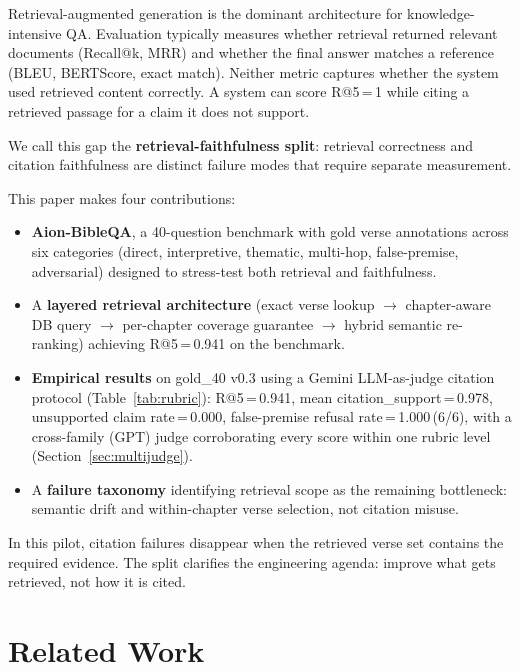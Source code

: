 \documentclass[11pt]{article}
\begin{document}
Retrieval-augmented generation \citep{lewis2020rag} is the dominant architecture for knowledge-intensive QA.
Evaluation typically measures whether retrieval returned relevant documents (Recall@k, MRR) and whether the final answer matches a reference (BLEU, BERTScore, exact match).
Neither metric captures whether the system used retrieved content correctly.
A system can score R@5\,=\,1 while citing a retrieved passage for a claim it does not support.

We call this gap the \textbf{retrieval-faithfulness split}: retrieval correctness and citation faithfulness are distinct failure modes that require separate measurement.

This paper makes four contributions:

\begin{itemize}
  \item \textbf{Aion-BibleQA}, a 40-question benchmark with gold verse annotations across six categories (direct, interpretive, thematic, multi-hop, false-premise, adversarial) designed to stress-test both retrieval and faithfulness.
  \item A \textbf{layered retrieval architecture} (exact verse lookup $\rightarrow$ chapter-aware DB query $\rightarrow$ per-chapter coverage guarantee $\rightarrow$ hybrid semantic re-ranking) achieving R@5\,=\,0.941 on the benchmark.
  \item \textbf{Empirical results} on gold\_40 v0.3 using a Gemini LLM-as-judge citation protocol (Table~\ref{tab:rubric}): R@5\,=\,0.941, mean citation\_support\,=\,0.978, unsupported claim rate\,=\,0.000, false-premise refusal rate\,=\,1.000\,(6/6), with a cross-family (GPT) judge corroborating every score within one rubric level (Section~\ref{sec:multijudge}).
  \item A \textbf{failure taxonomy} identifying retrieval scope as the remaining bottleneck: semantic drift and within-chapter verse selection, not citation misuse.
\end{itemize}

In this pilot, citation failures disappear when the retrieved verse set contains the required evidence.
The split clarifies the engineering agenda: improve what gets retrieved, not how it is cited.

\section{Related Work}
\end{document}
